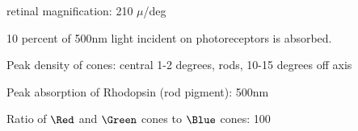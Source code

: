 
\item[Macaque] retinal magnification:  210 $\mu$/deg

\item 10 percent of 500nm light incident on photoreceptors is absorbed.

\item Peak density of cones: central 1-2 degrees, rods, 10-15 degrees off axis

\item Peak absorption of Rhodopsin (rod pigment): 500nm

\item Ratio of $\Red$ and $\Green$ cones to $\Blue$ cones: 100

\ee


